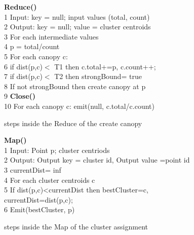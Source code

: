 \begin{figure}[H]
\hspace{3ex} \textbf{Reduce()}\\
1 \hspace{5ex}Input: key = null; input values (total, count)\\
2 \hspace{5ex}Output: key = null; value = cluster centroids\\
3 \hspace{5ex}For each intermediate values\\
4 \hspace{10ex}p = total/count\\
5 \hspace{10ex}For each canopy c:\\
6 \hspace{15ex}if dist(p,c)$<$ T1 then c.total+=p, c.count++;\\
7 \hspace{15ex}if dist(p,c)$<$ T2 then strongBound= true\\ 
8 \hspace{10ex}If not strongBound then create canopy at p\\
9 \hspace{5ex} \textbf{Close()}\\
10 \hspace{9ex}For each canopy c: emit(null, c.total/c.count)\\
\caption{steps inside the Reduce of the create canopy}
\label{fig:reduce}
\end{figure} 

\begin{figure}[H]
\hspace{3ex} \textbf{Map()}\\
1 \hspace{5ex}Input: Point p; cluster centriods\\
2 \hspace{5ex}Output: Output key = cluster id, Output value =point id\\
3 \hspace{5ex}currentDist= inf\\
4 \hspace{5ex}For each cluster centroids c\\
5 \hspace{10ex}If dist(p,c)<currentDist then bestCluster=c, currentDist=dist(p,c);\\
6 \hspace{5ex}Emit(bestCluster, p)\\
\caption{steps inside the Map of the cluster assignment}
\label{fig:map}
\end{figure} 


